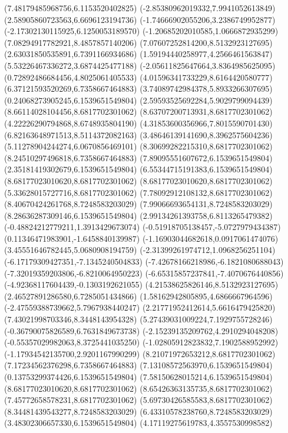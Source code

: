 {(7.48179485968756,6.1153520402825)
(-2.85380962019332,7.9941052613849)
(2.58905860723563,6.6696123194736)
(-1.74666902055206,3.2386749952877)
(-2.17302130115925,6.1250053189570)
(-1.20685202010585,1.0666872935299)
(7.08294917782921,8.4857857140206)
(7.07607252814200,8.5132923127695)
(2.63031850535891,6.7391166934686)
(1.59194440258977,4.2566461563847)
(5.53226467336272,3.6874425477188)
(-2.05611825647664,3.8364985625095)
(0.72892486684456,4.8025061405533)
(4.01596341733229,8.6164420580777)
(6.37121593520269,6.7358667464883)
(3.74089742984378,5.8933266307695)
(0.24068273905245,6.1539651549804)
(2.59593525692284,5.9029799094439)
(8.66114028104456,8.6817702301062)
(8.63707200713931,8.6817702301062)
(4.22226290794868,8.6748935804190)
(4.31853600356966,7.8015590701430)
(6.82163648971513,8.5114372082163)
(3.48646139141690,8.3962575604236)
(5.11278904244274,6.0670856469101)
(8.30699282215310,8.6817702301062)
(8.24510297496818,6.7358667464883)
(7.89095551607672,6.1539651549804)
(2.35181419302679,6.1539651549804)
(6.55344715191383,6.1539651549804)
(8.68177023010620,8.6817702301062)
(8.68177023010620,8.6817702301062)
(5.33628015727716,8.6817702301062)
(7.78092912108132,8.6817702301062)
(8.40670424261768,8.7248583203029)
(7.99066693654131,8.7248583203029)
(8.28636287309146,6.1539651549804)
(2.99134261393758,6.8113265479382)
(-0.48824212779211,1.3913429673074)
(-0.51918705138457,-5.0727979434387)
(0.11346471983901,-1.6458840139987)
(-1.16903044682618,0.0917061474076)
(3.45551646782445,5.0680908194759)
(-2.31399261974712,1.0968256251104)
(-6.17179309427351,-7.1345240504833)
(-7.42678166218986,-6.1821080688043)
(-7.32019359203806,-6.8210064950223)
(-6.65315857237841,-7.4070676440856)
(-4.92368117604439,-0.1303192621055)
(4.21538625826146,8.5132923127695)
(2.46527891286580,6.7285051434866)
(1.58162942805895,4.6866667964596)
(-2.47559388739662,5.7967938440247)
(2.21771952412614,5.6616479425820)
(7.43021998703346,8.3448143954328)
(5.27439031009224,7.1929755728246)
(-0.36790075826589,6.7631849673738)
(-2.15239135209762,4.2910294048208)
(-0.55357029982063,8.3725441035250)
(-1.02805912823832,7.1902588952992)
(-1.17934542135700,2.9201167990299)
(8.21071972653212,8.6817702301062)
(7.17234562376298,6.7358667464883)
(7.13108572563970,6.1539651549804)
(0.13753299374426,6.1539651549804)
(7.58150628015214,6.1539651549804)
(8.68177023010620,8.6817702301062)
(8.65426363135735,8.6817702301062)
(7.45772658578231,8.6817702301062)
(5.69730426585583,8.6817702301062)
(8.34481439543277,8.7248583203029)
(6.43310578238760,8.7248583203029)
(3.48302306657330,6.1539651549804)
(4.17119275619783,4.3557530998582)
}
